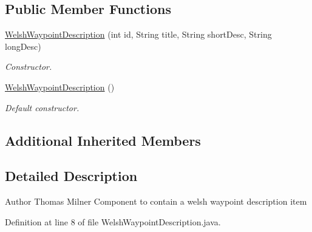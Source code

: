 \subsection*{Public Member Functions}
\begin{DoxyCompactItemize}
\item 
\hyperlink{classuk_1_1ac_1_1swan_1_1digitaltrails_1_1components_1_1_welsh_waypoint_description_a07a7f668aae7c34106a807ec1f3220de}{Welsh\+Waypoint\+Description} (int id, String title, String short\+Desc, String long\+Desc)
\begin{DoxyCompactList}\small\item\em Constructor. \end{DoxyCompactList}\item 
\hyperlink{classuk_1_1ac_1_1swan_1_1digitaltrails_1_1components_1_1_welsh_waypoint_description_abc99397f6f008f179abb0a89ab8c26a9}{Welsh\+Waypoint\+Description} ()
\begin{DoxyCompactList}\small\item\em Default constructor. \end{DoxyCompactList}\end{DoxyCompactItemize}
\subsection*{Additional Inherited Members}


\subsection{Detailed Description}
\begin{DoxyAuthor}{Author}
Thomas Milner Component to contain a welsh waypoint description item 
\end{DoxyAuthor}


Definition at line 8 of file Welsh\+Waypoint\+Description.\+java.




